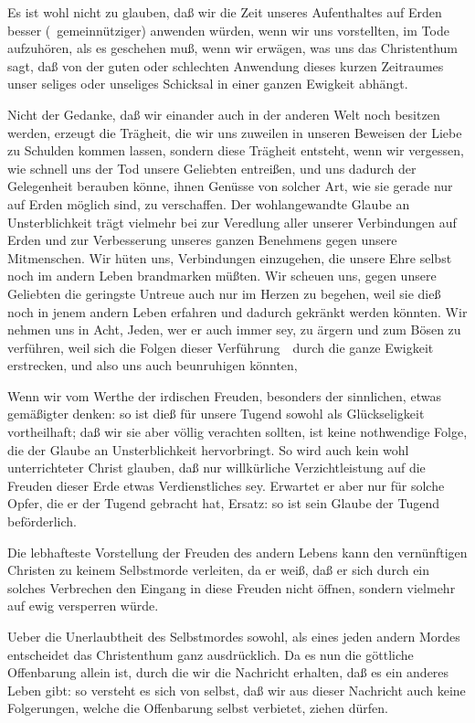 \begin{aufza}
\item Es ist wohl nicht zu glauben, daß wir die Zeit unseres Aufenthaltes auf Erden besser (\dh\ gemeinnütziger) anwenden würden, wenn wir uns vorstellten, im Tode aufzuhören, als es geschehen muß, wenn wir erwägen, was uns das Christenthum sagt, daß von der guten oder schlechten Anwendung dieses kurzen Zeitraumes unser seliges oder unseliges Schicksal in einer ganzen Ewigkeit abhängt.
\item Nicht der Gedanke, daß wir einander auch in der anderen Welt noch besitzen werden, erzeugt die Trägheit, die wir uns zuweilen in unseren Beweisen der Liebe zu Schulden kommen lassen, sondern diese Trägheit entsteht, wenn wir vergessen, wie schnell uns der Tod unsere Geliebten entreißen, und uns dadurch der Gelegenheit berauben könne, ihnen Genüsse von solcher Art, wie sie gerade nur auf Erden möglich sind, zu verschaffen. Der wohlangewandte Glaube an Unsterblichkeit trägt vielmehr bei zur Veredlung aller unserer Verbindungen auf Erden und zur Verbesserung unseres ganzen Benehmens gegen unsere Mitmenschen. Wir hüten uns, Verbindungen einzugehen, die unsere Ehre selbst noch im andern Leben brandmarken müßten. Wir scheuen uns, gegen unsere Geliebten die geringste Untreue auch nur im Herzen zu begehen, weil sie dieß noch in jenem andern Leben erfahren und dadurch gekränkt werden könnten. Wir nehmen uns in Acht, Jeden, wer er auch immer sey, zu ärgern und zum Bösen zu verführen, weil sich die Folgen dieser Verführung~\ durch die ganze Ewigkeit erstrecken, und also uns auch beunruhigen könnten, \usw\
\item Wenn wir vom Werthe der irdischen Freuden, besonders der sinnlichen, etwas gemäßigter denken: so ist dieß für unsere Tugend sowohl als Glückseligkeit vortheilhaft; daß wir sie aber völlig verachten sollten, ist keine nothwendige Folge, die der Glaube an Unsterblichkeit hervorbringt. So wird auch kein wohl unterrichteter Christ glauben, daß nur willkürliche Verzichtleistung auf die Freuden dieser Erde etwas Verdienstliches sey. Erwartet er aber nur für solche Opfer, die er der Tugend gebracht hat, Ersatz: so ist sein Glaube der Tugend beförderlich.
\item Die lebhafteste Vorstellung der Freuden des andern Lebens kann den vernünftigen Christen zu keinem Selbstmorde verleiten, da er weiß, daß er sich durch ein solches Verbrechen den Eingang in diese Freuden nicht öffnen, sondern vielmehr auf ewig versperren würde.
\item Ueber die Unerlaubtheit des Selbstmordes sowohl, als eines jeden andern Mordes entscheidet das Christenthum ganz ausdrücklich. Da es nun die göttliche Offenbarung allein ist, durch die wir die Nachricht erhalten, daß es ein anderes Leben gibt: so versteht es sich von selbst, daß wir aus dieser Nachricht auch keine Folgerungen, welche die Offenbarung selbst verbietet, ziehen dürfen.

\end{aufza}
